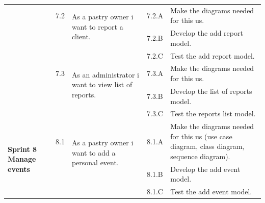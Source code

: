 \documentclass[12pt,a4paper]{report}
\begin{document}
	\begin{table}[H]
	\begin{center}
		\setlength\doublerulesep{0.5pt}
		\begin{tabular}{|  p{3cm}|  p{1cm}| p{4cm}|  p{1cm}| p{6cm}|}
		
			\cline{2-5}  
			
			&                       
			7.2  &  
			\multirow{2}{4cm}{As a pastry owner i want to report a client.}
			
			&				                      
			7.2.A &                        
			Make the diagrams needed for this \ac{us}.
			\\ 
			\cline{4-5}    
			&                   
			&                                 
			&                        
			7.2.B &                        
			Develop the add report model.
			\\ 
			\cline{4-5}    
			&                   
			&                                 
			&                        
			7.2.C &                        
			Test the add report model.
			\\
			\cline{2-5}  
			
			&                       
			7.3  &  
			\multirow{2}{4cm}{As an administrator i want to view list of reports.}
			
			&				                      
			7.3.A &                        
			Make the diagrams needed for this \ac{us}.
			\\ 
			\cline{4-5}    
			&                   
			&                                 
			&                        
			7.3.B &                        
			Develop the list of reports model.
			\\ 
			\cline{4-5}    
			&                   
			&                                 
			&                        
			7.3.C &                        
			Test the reports list model.
			\\
			\hline
			\multirow{5}{3cm}{\textbf{Sprint 8} \textbf{Manage events} }
			&                       
			8.1  &  
			\multirow{2}{4cm}{As a pastry owner i want to add a personal event.}
			
			&				                      
			8.1.A &                        
			Make the diagrams needed for this \ac{us} (use case diagram, class diagram, sequence diagram).
			\\ 
			\cline{4-5}    
			&                   
			&                                 
			&                        
			8.1.B &                        
			Develop the add event model.
			\\ 
			\cline{4-5}    
			&                   
			&                                 
			&                        
			8.1.C &                        
			Test the add event model.
			\\
			\cline{2-5}  
			

\end{tabular}
\end{center}
\end{table}
\end{document}
